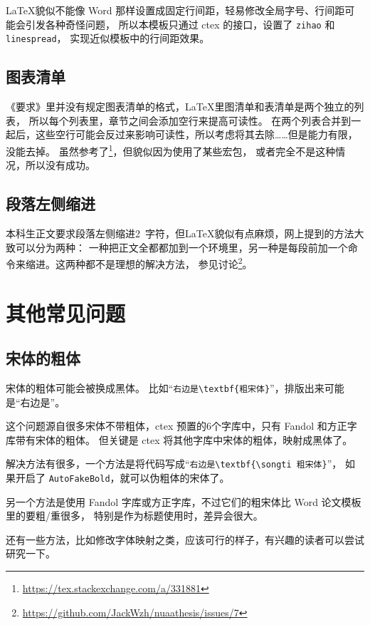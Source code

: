 \LaTeX 貌似不能像 Word 那样设置成固定行间距，轻易修改全局字号、行间距可能会引发各种奇怪问题，
所以本模板只通过 ctex 的接口，设置了 \texttt{zihao} 和 \texttt{linespread}，
实现近似模板中的行间距效果。

\subsection{图表清单}

《要求》里并没有规定图表清单的格式，\LaTeX 里图清单和表清单是两个独立的列表，
所以每个列表里，章节之间会添加空行来提高可读性。
在两个列表合并到一起后，这些空行可能会反过来影响可读性，所以考虑将其去除……但是能力有限，没能去掉。
虽然参考了\footnote{\url{https://tex.stackexchange.com/a/331881}}，但貌似因为使用了某些宏包，
或者完全不是这种情况，所以没有成功。

\subsection{段落左侧缩进}

本科生正文要求段落左侧缩进2~字符，但\LaTeX 貌似有点麻烦，网上提到的方法大致可以分为两种：
一种把正文全都都加到一个环境里，另一种是每段前加一个命令来缩进。这两种都不是理想的解决方法，
参见讨论\footnote{\url{https://github.com/JackWzh/nuaathesis/issues/7}}。

\section{其他常见问题}

\subsection{宋体的粗体}\label{txt:issue:boldsun}

宋体的粗体可能会被换成黑体。
比如“\verb|右边是\textbf{粗宋体}|”，排版出来可能是“{右边是}”。

这个问题源自很多宋体不带粗体，ctex 预置的6个字库中，只有 Fandol 和方正字库带有宋体的粗体。
但关键是 ctex 将其他字库中宋体的粗体，映射成黑体了。

解决方法有很多，一个方法是将代码写成“\verb|右边是\textbf{\songti 粗宋体}|”，
如果开启了 \texttt{AutoFakeBold}，就可以伪粗体的宋体了。

另一个方法是使用 Fandol 字库或方正字库，不过它们的粗宋体比 Word 论文模板里的要粗/重很多，
特别是作为标题使用时，差异会很大。

还有一些方法，比如修改字体映射之类，应该可行的样子，有兴趣的读者可以尝试研究一下。
